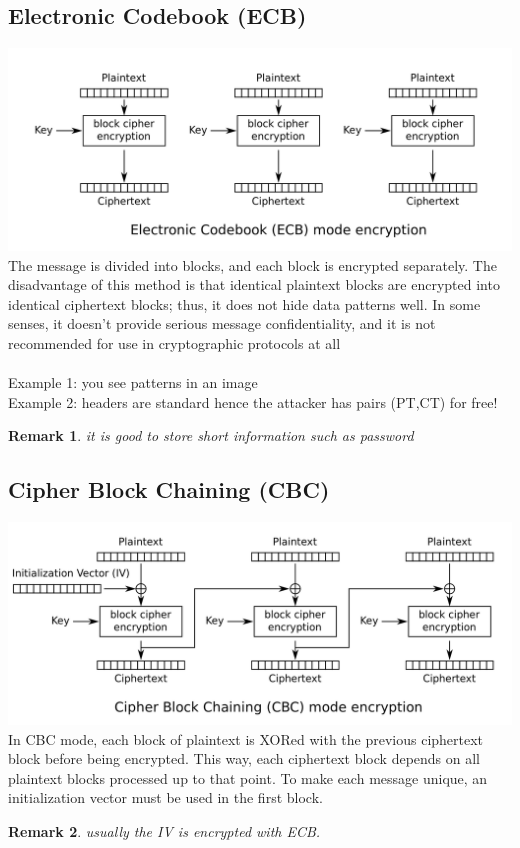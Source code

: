 \documentclass[10pt,a4paper]{article}
\newtheorem{remark}{Remark}
\begin{document}
\subsection{Electronic Codebook (ECB)}
\includegraphics[scale=0.2]{img/ECB.png}
\newline
The message is divided into blocks, and each block is encrypted separately. The disadvantage of this method is that identical plaintext blocks are encrypted into identical ciphertext blocks; thus, it does not hide data patterns well. In some senses, it doesn't provide serious message confidentiality, and it is not recommended for use in cryptographic protocols at all\\\\
Example 1: you see patterns in an image\\
Example 2: headers are standard hence the attacker has pairs (PT,CT) for free!
\begin{remark} it is good to store short information such as password \end{remark}
\subsection{Cipher Block Chaining (CBC)}
\includegraphics[scale=0.2]{img/CBC.png}
\newline
 In CBC mode, each block of plaintext is XORed with the previous ciphertext block before being encrypted. This way, each ciphertext block depends on all plaintext blocks processed up to that point. To make each message unique, an initialization vector must be used in the first block.
\begin{remark} usually the IV is encrypted with ECB. \end{remark}
\end{document}
